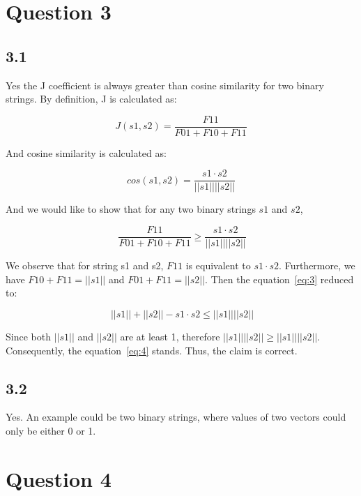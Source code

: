 \documentclass[paper=a4, fontsize=11pt]{scrartcl} %
\begin{document}
\section*{Question 3}

\subsection*{3.1} Yes the J coefficient is always greater than cosine similarity for two binary strings. By definition, J is calculated as:

\begin{equation} \label{eq:solve}
J(s1, s2) = \frac{F11}{F01+F10+F11} 				
\end{equation}

And cosine similarity is calculated as:

\begin{equation} 
cos(s1, s2) = \frac{s1 \cdot s2}{||s1|| ||s2||}
\end{equation}

And we would like to show that for any two binary strings $s1$ and $s2$,

\begin{equation}~\label{eq:3}
\frac{F11}{F01+F10+F11} \geq \frac{s1 \cdot s2}{||s1|| ||s2||}
\end{equation}

We observe that for string s1 and s2, $F11$ is equivalent to $s1 \cdot s2$. Furthermore, we have $F10 + F11 = ||s1||$ and $F01 + F11 = ||s2||$. Then the equation~\ref{eq:3} reduced to: 

\begin{equation}~\label{eq:4}
||s1|| + ||s2|| - s1 \cdot s2 \leq ||s1|| ||s2||
\end{equation}

Since both $||s1||$ and $||s2||$ are at least 1, therefore $||s1|| ||s2|| \geq ||s1|| ||s2||$. Consequently, the equation~\ref{eq:4} stands. Thus, the claim is correct.


\subsection*{3.2} Yes. An example could be two binary strings, where values of two vectors could only be either 0 or 1.

\section*{Question 4}
\end{document}
